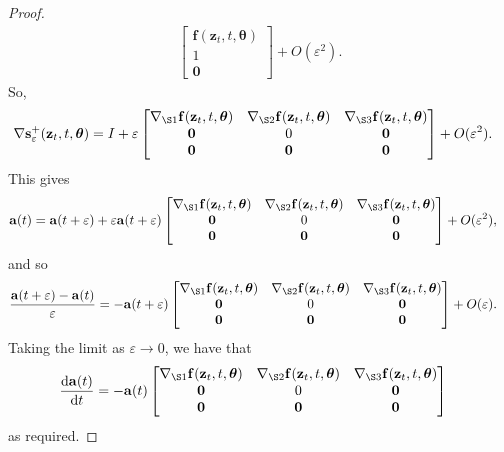 \documentclass[10pt]{article}
\newcommand{\dee}{\mathrm{d}}
\newcommand{\ve}[1]{\mathbf{#1}}
\newcommand{\ves}[1]{\boldsymbol{#1}}
\begin{document}
\begin{itemize}
\begin{proof}
\begin{align*}
\begin{bmatrix}
        \ve{f}(\ve{z}_t, t, \ves{\theta}) \\
        1 \\
        \ve{0}
      \end{bmatrix} 
      + O(\varepsilon^2).      
    \end{align*}
    So,
    \begin{align*}
      \nabla \ve{s}^+_\varepsilon(\ve{z}_t, t, \ves{\theta})
      &= I + \varepsilon \begin{bmatrix}
        \nabla_{\S1}\ve{f}(\ve{z}_t, t, \ves{\theta})
        & \nabla_{\S2}\ve{f}(\ve{z}_t, t, \ves{\theta})
        & \nabla_{\S3}\ve{f}(\ve{z}_t, t, \ves{\theta}) \\
        \ve{0} & 0 & \ve{0} \\
        \ve{0} & \ve{0} & \ve{0}
      \end{bmatrix} + O(\varepsilon^2).
    \end{align*}
    This gives
    \begin{align*}
      \ve{a}(t) 
      &= \ve{a}(t + \varepsilon) 
      + \varepsilon \ve{a}(t + \varepsilon) \begin{bmatrix}
        \nabla_{\S1}\ve{f}(\ve{z}_t, t, \ves{\theta})
        & \nabla_{\S2}\ve{f}(\ve{z}_t, t, \ves{\theta})
        & \nabla_{\S3}\ve{f}(\ve{z}_t, t, \ves{\theta}) \\
        \ve{0} & 0 & \ve{0} \\
        \ve{0} & \ve{0} & \ve{0}
      \end{bmatrix} + O(\varepsilon^2),
    \end{align*}
    and so
    \begin{align*}
      \frac{\ve{a}(t+\varepsilon) - \ve{a}(t)}{\varepsilon} 
      &= -\ve{a}(t + \varepsilon) \begin{bmatrix}
        \nabla_{\S1}\ve{f}(\ve{z}_t, t, \ves{\theta})
        & \nabla_{\S2}\ve{f}(\ve{z}_t, t, \ves{\theta})
        & \nabla_{\S3}\ve{f}(\ve{z}_t, t, \ves{\theta}) \\
        \ve{0} & 0 & \ve{0} \\
        \ve{0} & \ve{0} & \ve{0}
      \end{bmatrix} + O(\varepsilon).
    \end{align*}
    Taking the limit as $\varepsilon \rightarrow 0$, we have that
    \begin{align*}
      \frac{\dee \ve{a}(t)}{\dee t}
      &= -\ve{a}(t) \begin{bmatrix}
        \nabla_{\S1}\ve{f}(\ve{z}_t, t, \ves{\theta})
        & \nabla_{\S2}\ve{f}(\ve{z}_t, t, \ves{\theta})
        & \nabla_{\S3}\ve{f}(\ve{z}_t, t, \ves{\theta}) \\
        \ve{0} & 0 & \ve{0} \\
        \ve{0} & \ve{0} & \ve{0}
      \end{bmatrix}
    \end{align*}
    as required.
  \end{proof}
  

\end{itemize}
\end{document}
